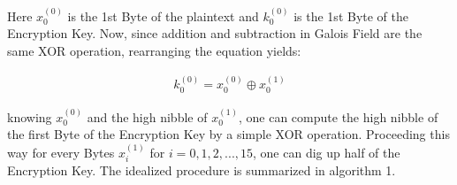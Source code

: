 Here $x_0^{(0)}$ is the 1st Byte of the plaintext and $k_0^{(0)}$ is the 1st Byte of the Encryption Key. Now, since addition and subtraction in Galois Field are the same XOR operation, rearranging the equation yields:

\begin{align*}
k_0^{(0)}=x_0^{(0)} \oplus x_0^{(1)}
\end{align*}

knowing $x_0^{(0)}$ and the high nibble of $x_0^{(1)}$, one can compute the high nibble of the first Byte of the Encryption Key by a simple XOR operation. Proceeding this way for every Bytes $x_i^{(1)}$ for $i=0,1,2,...,15$, one can  dig up half of the Encryption Key. The idealized procedure is summarized in algorithm 1.
